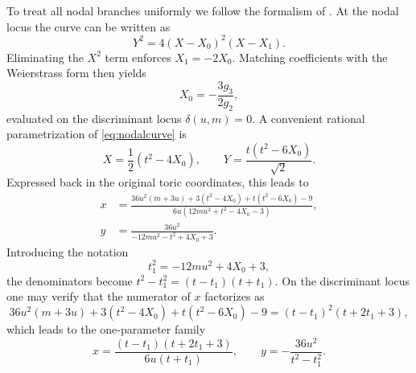 \documentclass[11pt, a4paper]{article}
\numberwithin{equation}{section}
\begin{document}
To treat all nodal branches uniformly we follow the formalism of \cite{Marino:LocalF1Notes}. At the nodal locus the curve can be written as
\begin{equation}\label{eq:nodalcurve}
  Y^2 = 4 (X - X_0)^2 (X - X_1).
\end{equation}
Eliminating the $X^2$ term enforces $X_1 = -2 X_0$. Matching coefficients with the Weierstrass form then yields
\begin{equation}
  X_0 = -\frac{3 g_3}{2 g_2},
\end{equation}
evaluated on the discriminant locus $\delta(u,m)=0$. A convenient rational parametrization of \cref{eq:nodalcurve} is
\begin{equation}\label{eq:nodalcurveparamorig}
  X = \frac{1}{2}\left(t^2 - 4 X_0\right),
  \qquad
  Y = \frac{t\left(t^2 - 6 X_0\right)}{\sqrt{2}}.
\end{equation}
Expressed back in the original toric coordinates, this leads to
\begin{equation}
\begin{aligned}
  x &= \frac{36 u^2 (m+3 u)+3 (t^2 - 4 X_0) + t(t^2 - 6 X_0) - 9}{6 u \left(12 m u^2 + t^2 - 4 X_0 - 3\right)}, \\
  y &= \frac{36 u^2}{-12 m u^2 - t^2 + 4 X_0 + 3}.
\end{aligned}
\end{equation}
Introducing the notation
\begin{equation}
  t_1^2 = -12 m u^2 + 4 X_0 + 3,
\end{equation}
the denominators become $t^2 - t_1^2 = (t - t_1)(t + t_1)$. On the discriminant locus one may verify that the numerator of $x$ factorizes as
\begin{equation}
  36 u^2 (m+3 u)+3(t^2 - 4 X_0) + t(t^2 - 6 X_0) - 9 
  = (t - t_1)^2 (t + 2 t_1 + 3),
\end{equation}
which leads to the one-parameter family
\begin{equation}\label{eq:tparam}
  x = \frac{(t - t_1)(t + 2 t_1 + 3)}{6 u (t + t_1)},
  \qquad
  y = -\frac{36 u^2}{t^2 - t_1^2}.
\end{equation}
\end{document}
